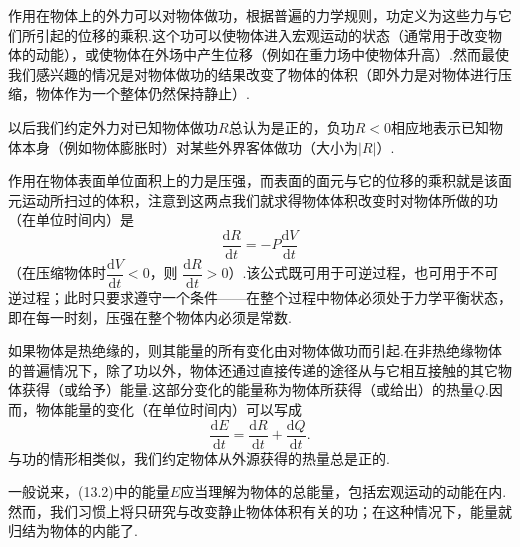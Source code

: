 作用在物体上的外力可以对物体做功，根据普遍的力学规则，功定义为这些力与它们所引起的位移的乘积.这个功可以使物体进入宏观运动的状态（通常用于改变物体的动能），或使物体在外场中产生位移（例如在重力场中使物体升高）.然而最使我们感兴趣的情况是对物体做功的结果改变了物体的体积（即外力是对物体进行压缩，物体作为一个整体仍然保持静止）.

以后我们约定外力对已知物体做功$R$总认为是正的，负功$R<0$相应地表示已知物体本身（例如物体膨胀时）对某些外界客体做功（大小为$|R|$）.

作用在物体表面单位面积上的力是压强，而表面的面元与它的位移的乘积就是该面元运动所扫过的体积，注意到这两点我们就求得物体体积改变时对物体所做的功（在单位时间内）是
\begin{equation}
  \frac{\mathrm{d}R}{\mathrm{d}t}
  =-P\frac{\mathrm{d}V}{\mathrm{d}t}
\end{equation}
（在压缩物体时$\dfrac{\mathrm{d}V}{\mathrm{d}t}<0$，则
$\dfrac{\mathrm{d}R}{\mathrm{d}t}>0$）.该公式既可用于可逆过程，也可用于不可逆过程；此时只要求遵守一个条件——在整个过程中物体必须处于力学平衡状态，即在每一时刻，压强在整个物体内必须是常数.

如果物体是热绝缘的，则其能量的所有变化由对物体做功而引起.在非热绝缘物体的普遍情况下，除了功以外，物体还通过直接传递的途径从与它相互接触的其它物体获得（或给予）能量.这部分变化的能量称为物体所获得（或给出）的热量$Q$.因而，物体能量的变化（在单位时间内）可以写成
\begin{equation}
  \frac{\mathrm{d}E}{\mathrm{d}t}
  =\frac{\mathrm{d}R}{\mathrm{d}t}+\frac{\mathrm{d}Q}{\mathrm{d}t}.
\end{equation}
与功的情形相类似，我们约定物体从外源获得的热量总是正的.

一般说来，(13.2)中的能量$E$应当理解为物体的总能量，包括宏观运动的动能在内.然而，我们习惯上将只研究与改变静止物体体积有关的功；在这种情况下，能量就归结为物体的内能了.

